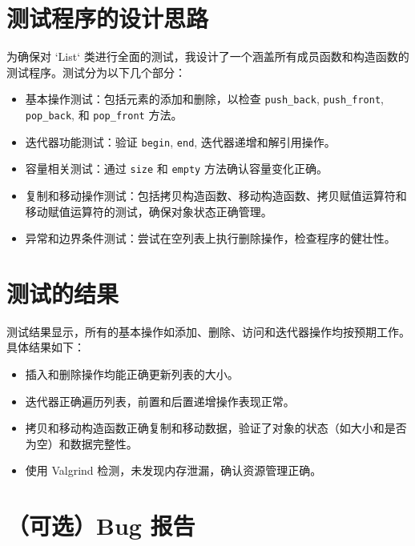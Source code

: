 \documentclass[UTF8]{ctexart}
\begin{document}
\pagestyle{fancy}
\fancyhead{}

\section{测试程序的设计思路}

为确保对 `List` 类进行全面的测试，我设计了一个涵盖所有成员函数和构造函数的测试程序。测试分为以下几个部分：  
  
\begin{itemize}    
    \item 基本操作测试：包括元素的添加和删除，以检查 \texttt{push\_back}, \texttt{push\_front}, \texttt{pop\_back}, 和 \texttt{pop\_front} 方法。    
    \item 迭代器功能测试：验证 \texttt{begin}, \texttt{end}, 迭代器递增和解引用操作。    
    \item 容量相关测试：通过 \texttt{size} 和 \texttt{empty} 方法确认容量变化正确。    
    \item 复制和移动操作测试：包括拷贝构造函数、移动构造函数、拷贝赋值运算符和移动赋值运算符的测试，确保对象状态正确管理。    
    \item 异常和边界条件测试：尝试在空列表上执行删除操作，检查程序的健壮性。    
\end{itemize}   
  
\section{测试的结果}  
  
测试结果显示，所有的基本操作如添加、删除、访问和迭代器操作均按预期工作。具体结果如下：  
  
\begin{itemize}    
    \item 插入和删除操作均能正确更新列表的大小。    
    \item 迭代器正确遍历列表，前置和后置递增操作表现正常。    
    \item 拷贝和移动构造函数正确复制和移动数据，验证了对象的状态（如大小和是否为空）和数据完整性。    
    \item 使用 Valgrind 检测，未发现内存泄漏，确认资源管理正确。    
\end{itemize}  
  
\section{（可选）Bug 报告}  
  
\end{document}
